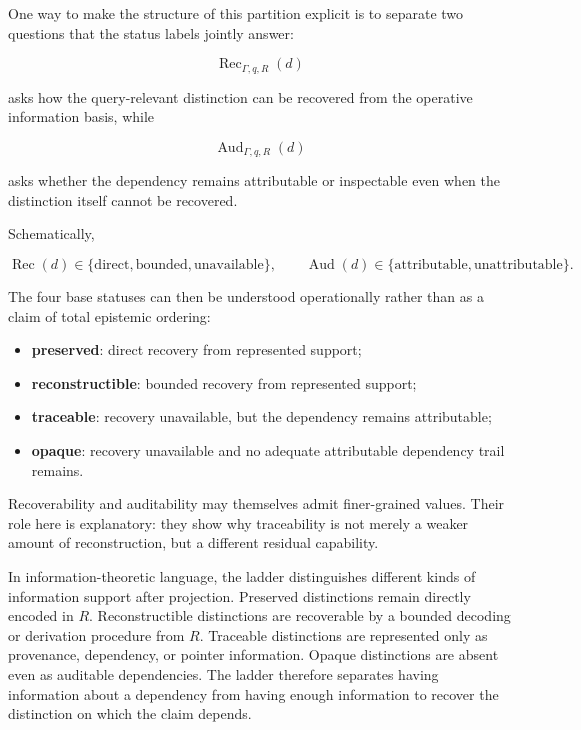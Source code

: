 \documentclass[11pt]{article}
\begin{document}
One way to make the structure of this partition explicit is to separate two questions that the status labels jointly answer:

\[
\operatorname{Rec}_{\Gamma,q,R}(d)
\]

asks how the query-relevant distinction can be recovered from the operative information basis, while

\[
\operatorname{Aud}_{\Gamma,q,R}(d)
\]

asks whether the dependency remains attributable or inspectable even when the distinction itself cannot be recovered.

Schematically,

\[
\operatorname{Rec}(d)
\in
\{\text{direct},\text{bounded},\text{unavailable}\},
\qquad
\operatorname{Aud}(d)
\in
\{\text{attributable},\text{unattributable}\}.
\]

The four base statuses can then be understood operationally rather than as a claim of total epistemic ordering:

\begin{itemize}[leftmargin=1.5em]
    \item \textbf{preserved}: direct recovery from represented support;
    \item \textbf{reconstructible}: bounded recovery from represented support;
    \item \textbf{traceable}: recovery unavailable, but the dependency remains attributable;
    \item \textbf{opaque}: recovery unavailable and no adequate attributable dependency trail remains.
\end{itemize}

Recoverability and auditability may themselves admit finer-grained values. Their role here is explanatory: they show why traceability is not merely a weaker amount of reconstruction, but a different residual capability.

In information-theoretic language, the ladder distinguishes different kinds of information support after projection. Preserved distinctions remain directly encoded in $R$. Reconstructible distinctions are recoverable by a bounded decoding or derivation procedure from $R$. Traceable distinctions are represented only as provenance, dependency, or pointer information. Opaque distinctions are absent even as auditable dependencies. The ladder therefore separates having information about a dependency from having enough information to recover the distinction on which the claim depends.
\end{document}
